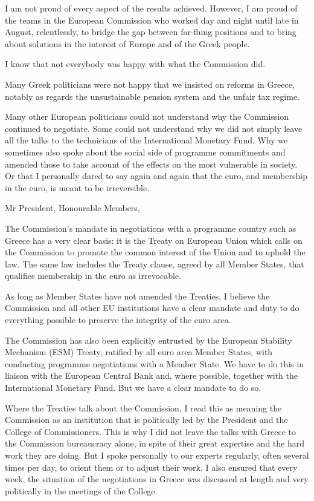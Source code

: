 \documentclass[a4paper,11pt]{article}
\begin{document}
I am not proud of every aspect of the results achieved. However, I am proud of the teams in the European Commission who worked day and night until late in August, relentlessly, to bridge the gap between far-flung positions and to bring about solutions in the interest of Europe and of the Greek people.

I know that not everybody was happy with what the Commission did.

Many Greek politicians were not happy that we insisted on reforms in Greece, notably as regards the unsustainable pension system and the unfair tax regime.

Many other European politicians could not understand why the Commission continued to negotiate. Some could not understand why we did not simply leave all the talks to the technicians of the International Monetary Fund. Why we sometimes also spoke about the social side of programme commitments and amended those to take account of the effects on the most vulnerable in society. Or that I personally dared to say again and again that the euro, and membership in the euro, is meant to be irreversible.

 

Mr President, Honourable Members,

The Commission’s mandate in negotiations with a programme country such as Greece has a very clear basis: it is the Treaty on European Union which calls on the Commission to promote the common interest of the Union and to uphold the law. The same law includes the Treaty clause, agreed by all Member States, that qualifies membership in the euro as irrevocable.

As long as Member States have not amended the Treaties, I believe the Commission and all other EU institutions have a clear mandate and duty to do everything possible to preserve the integrity of the euro area.

The Commission has also been explicitly entrusted by the European Stability Mechanism (ESM) Treaty, ratified by all euro area Member States, with conducting programme negotiations with a Member State. We have to do this in liaison with the European Central Bank and, where possible, together with the International Monetary Fund. But we have a clear mandate to do so.

Where the Treaties talk about the Commission, I read this as meaning the Commission as an institution that is politically led by the President and the College of Commissioners. This is why I did not leave the talks with Greece to the Commission bureaucracy alone, in spite of their great expertise and the hard work they are doing. But I spoke personally to our experts regularly, often several times per day, to orient them or to adjust their work. I also ensured that every week, the situation of the negotiations in Greece was discussed at length and very politically in the meetings of the College.
\end{document}
